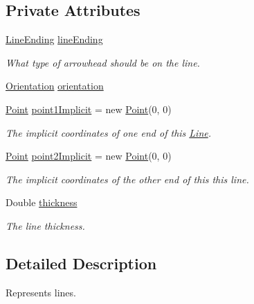 \subsection*{Private Attributes}
\begin{DoxyCompactItemize}
\item 
\hyperlink{classcom_1_1aarrelaakso_1_1drawl_1_1_line_ending}{Line\+Ending} \hyperlink{classcom_1_1aarrelaakso_1_1drawl_1_1_line_a8b339d5d292d8584536ba0c19478bb27}{line\+Ending}
\begin{DoxyCompactList}\small\item\em What type of arrowhead should be on the line. \end{DoxyCompactList}\item 
\hyperlink{enumcom_1_1aarrelaakso_1_1drawl_1_1_line_1_1_orientation}{Orientation} \hyperlink{classcom_1_1aarrelaakso_1_1drawl_1_1_line_a441ce546831b219e01f5fd0f7e0bb3b1}{orientation}
\item 
\hyperlink{classcom_1_1aarrelaakso_1_1drawl_1_1_point}{Point} \hyperlink{classcom_1_1aarrelaakso_1_1drawl_1_1_line_a48220286707ae05387f9c99d9e08784c}{point1\+Implicit} = new \hyperlink{classcom_1_1aarrelaakso_1_1drawl_1_1_point}{Point}(0, 0)
\begin{DoxyCompactList}\small\item\em The implicit coordinates of one end of this \hyperlink{classcom_1_1aarrelaakso_1_1drawl_1_1_line}{Line}. \end{DoxyCompactList}\item 
\hyperlink{classcom_1_1aarrelaakso_1_1drawl_1_1_point}{Point} \hyperlink{classcom_1_1aarrelaakso_1_1drawl_1_1_line_a055d1e743c66cc808f108664b38d7de2}{point2\+Implicit} = new \hyperlink{classcom_1_1aarrelaakso_1_1drawl_1_1_point}{Point}(0, 0)
\begin{DoxyCompactList}\small\item\em The implicit coordinates of the other end of this this line. \end{DoxyCompactList}\item 
Double \hyperlink{classcom_1_1aarrelaakso_1_1drawl_1_1_line_a314ae0371f5665cf70ad99742d44934a}{thickness}
\begin{DoxyCompactList}\small\item\em The line thickness. \end{DoxyCompactList}\end{DoxyCompactItemize}


\subsection{Detailed Description}
Represents lines. 

